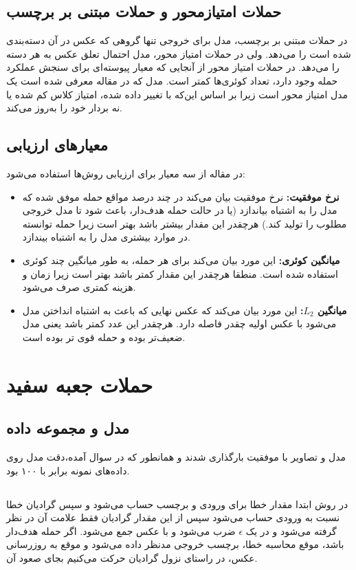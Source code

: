 \subsection{حملات امتیازمحور و حملات مبتنی بر برچسب }
در حملات مبتنی بر برچسب، مدل برای خروجی تنها گروهی که عکس در آن دسته‌بندی شده است را می‌دهد. ولی در حملات امتیاز محور، مدل احتمال تعلق عکس به هر دسته را می‌دهد. در حملات امتیاز محور از آنجایی که معیار پیوسته‌ای برای سنجش عملکرد حمله وجود دارد، تعداد کوئری‌ها کمتر است. مدل 
که در مقاله معرفی شده است یک مدل امتیاز محور است زیرا بر اساس این‌که با تغییر داده شده، امتیاز کلاس کم شده یا نه بردار خود را به‌روز می‌کند. 
\subsection{معیارهای ارزیابی}
در مقاله از سه معیار برای ارزیابی روش‌ها استفاده می‌شود:
\begin{itemize}
	\item 
	\textbf{نرخ موفقیت:}
	نرخ موفقیت بیان می‌کند در چند درصد مواقع حمله موفق شده که مدل را به اشتباه بیاندازد (یا در حالت حمله هدف‌دار، باعث شود تا مدل خروجی مطلوب را تولید کند.) هرچقدر این مقدار بیشتر باشد بهتر است زیرا حمله توانسته در موارد بیشتری مدل را به اشتباه بیندازد.  
	\item 
	\textbf{میانگین کوئری:}
	این مورد بیان می‌کند برای هر حمله، به طور میانگین چند کوئری استفاده شده است. منطقا هرچقدر این مقدار کمتر باشد بهتر است زیرا زمان و هزینه کمتری صرف می‌شود.
	\item 
	\textbf{میانگین $L_2$:}
	این مورد بیان می‌کند که عکس نهایی که باعث به اشتباه انداختن مدل می‌شود با عکس اولیه چقدر فاصله دارد. هرچقدر این عدد کمتر باشد یعنی مدل ضعیف‌تر بوده و حمله قوی تر بوده است. 
	

\end{itemize}
	\section{حملات جعبه سفید}
	\subsection{مدل و مجموعه داده }
	مدل و تصاویر با موفقیت بارگذاری شدند  و همانطور که در سوال آمده،‌دقت مدل روی داده‌های نمونه برابر با ۱۰۰ بود.
	\subsection{}
	در روش 
	ابتدا مقدار خطا برای ورودی و برچسب حساب می‌شود و سپس گرادیان خطا نسبت به ورودی حساب می‌شود سپس از این مقدار گرادیان فقط علامت آن در نظر گرفته می‌شود و در یک 
	$\epsilon$
	ضرب می‌شود و با عکس جمع می‌شود. اگر حمله هدف‌دار باشد، موقع محاسبه خطا، برچسب خروجی مدنظر داده می‌شود و موقع به روزرسانی عکس، در راستای نزول گرادیان حرکت می‌کنیم بجای صعود آن. 
	
